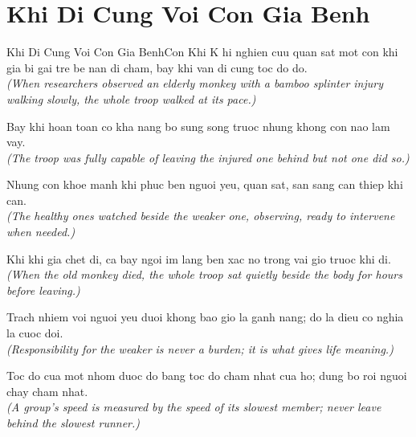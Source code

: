\section{Khi Di Cung Voi Con Gia Benh}
\begin{truyen}{Khi Di Cung Voi Con Gia Benh}{Con Khi}
K hi nghien cuu quan sat mot con khi gia bi gai tre be nan di cham, bay khi van di cung toc do do.\\
\textit{(When researchers observed an elderly monkey with a bamboo splinter injury walking slowly, the whole troop walked at its pace.)}

Bay khi hoan toan co kha nang bo sung song truoc nhung khong con nao lam vay.\\
\textit{(The troop was fully capable of leaving the injured one behind but not one did so.)}

Nhung con khoe manh khi phuc ben nguoi yeu, quan sat, san sang can thiep khi can.\\
\textit{(The healthy ones watched beside the weaker one, observing, ready to intervene when needed.)}

Khi khi gia chet di, ca bay ngoi im lang ben xac no trong vai gio truoc khi di.\\
\textit{(When the old monkey died, the whole troop sat quietly beside the body for hours before leaving.)}

Trach nhiem voi nguoi yeu duoi khong bao gio la ganh nang; do la dieu co nghia la cuoc doi.\\
\textit{(Responsibility for the weaker is never a burden; it is what gives life meaning.)}

\end{truyen}
\begin{baihoc}
  Toc do cua mot nhom duoc do bang toc do cham nhat cua ho; dung bo roi nguoi chay cham nhat.\\
  \textit{(A group's speed is measured by the speed of its slowest member; never leave behind the slowest runner.)}
\end{baihoc}

